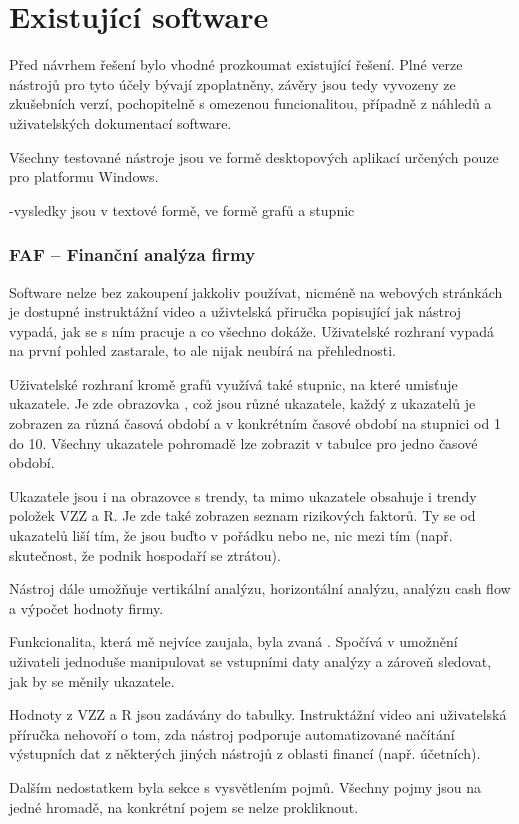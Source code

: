 \section{Existující software}
Před návrhem řešení bylo vhodné prozkoumat existující řešení. Plné verze nástrojů pro tyto účely bývají zpoplatněny, závěry jsou tedy vyvozeny ze zkušebních verzí, pochopitelně s omezenou funcionalitou, případně z náhledů a uživatelských dokumentací software.

Všechny testované nástroje jsou ve formě desktopových aplikací určených pouze pro platformu Windows.

-vysledky jsou v textové formě, ve formě grafů a stupnic

\subsubsection{FAF -- Finanční analýza firmy}
Software nelze bez zakoupení jakkoliv používat, nicméně na webových stránkách je dostupné instruktážní video a uživtelská přiručka popisující jak nástroj vypadá, jak se s ním pracuje a co všechno dokáže. Uživatelské rozhraní vypadá na první pohled zastarale, to ale nijak neubírá na přehlednosti.

Uživatelské rozhraní kromě grafů využívá také stupnic, na které umisťuje ukazatele. Je zde obrazovka , což jsou různé ukazatele, každý z ukazatelů je zobrazen za různá časová období a v konkrétním časové období na stupnici od 1 do 10. Všechny ukazatele pohromadě lze zobrazit v tabulce pro jedno časové období.

Ukazatele jsou i na obrazovce s trendy, ta mimo ukazatele obsahuje i trendy položek VZZ a R. Je zde také zobrazen seznam rizikových faktorů. Ty se od ukazatelů liší tím, že jsou buďto v pořádku nebo ne, nic mezi tím (např. skutečnost, že podnik hospodaří se ztrátou).

Nástroj dále umožňuje vertikální analýzu, horizontální analýzu, analýzu cash flow a výpočet hodnoty firmy.

Funkcionalita, která mě nejvíce zaujala, byla zvaná . Spočívá v umožnění uživateli jednoduše manipulovat se vstupními daty analýzy a zároveň sledovat, jak by se měnily ukazatele.

Hodnoty z VZZ a R jsou zadávány do tabulky. Instruktážní video ani uživatelská příručka nehovoří o tom, zda nástroj podporuje automatizované načítání výstupních dat z některých jiných nástrojů z oblasti financí (např. účetních).

Dalším nedostatkem byla sekce s vysvětlením pojmů. Všechny pojmy jsou na jedné hromadě, na konkrétní pojem se nelze prokliknout.


